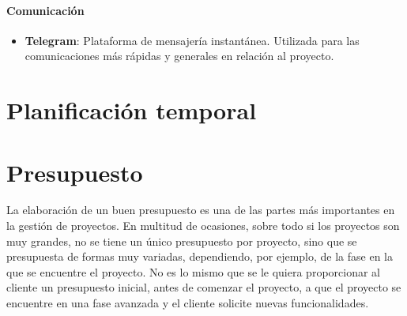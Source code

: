 \paragraph{Comunicación}
\begin{itemize}
    \item \textbf{Telegram}: Plataforma de mensajería instantánea. Utilizada para las comunicaciones más rápidas y generales en relación al proyecto.
\end{itemize}

\section{Planificación temporal}

\section{Presupuesto}
La elaboración de un buen presupuesto es una de las partes más importantes en la gestión de proyectos. En multitud de ocasiones, sobre todo si los proyectos son muy grandes, no se tiene un único presupuesto por proyecto, sino que se presupuesta de formas muy variadas, dependiendo, por ejemplo, de la fase en la que se encuentre el proyecto. No es lo mismo que se le quiera proporcionar al cliente un presupuesto inicial, antes de comenzar el proyecto, a que el proyecto se encuentre en una fase avanzada y el cliente solicite nuevas funcionalidades.

